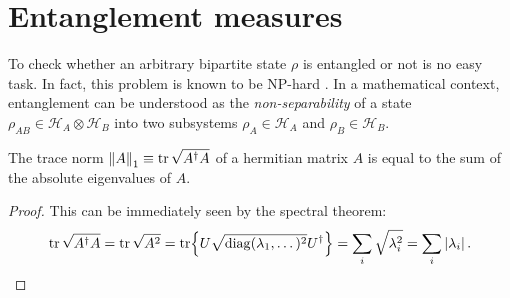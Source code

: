 \section{Entanglement measures}
To check whether an arbitrary bipartite state $\rho$ is entangled or not is no easy task. In fact, this problem is known to be NP-hard \cite{Gurvits_2003}.
In a mathematical context, entanglement can be understood as the \emph{non-separability} of a state $\rho_{AB} \in \mathcal{H}_A \otimes \mathcal{H}_B$ into two subsystems $\rho_A \in \mathcal{H}_A$ and $\rho_B \in \mathcal{H}_B$.





\begin{lemma}\label{lemma:trace-norm-hermitian}
  The trace norm $\left\lVert A\right\rVert_1 \equiv \tr \sqrt{A^\dagger A}$ of a hermitian matrix $A$ is equal to the sum of the absolute eigenvalues of $A$.
\end{lemma}
\begin{proof}
  This can be immediately seen by the spectral theorem:
  \begin{equation*}
    \tr \sqrt{A^\dagger A} = \tr \sqrt{A^2} = \tr{U\sqrt{\operatorname{diag}(\lambda_1, \dots)^2}U^\dagger} = \sum_i \sqrt{\lambda_i^2} = \sum_i \left\lvert\lambda_i\right\rvert.
  \end{equation*}
\end{proof}

